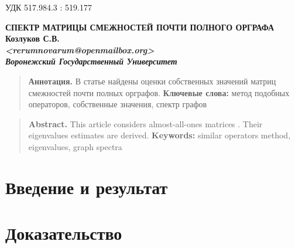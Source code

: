 \documentclass{article}
\theoremstyle{definition}
\theoremstyle{plain}
\theoremstyle{remark}
\begin{document}
\setcounter{thm}{0}
\setcounter{lemma}{0}
\quad УДК 517.984.3 : 519.177

\begin{center}
%
\vskip0.5cm
\textbf{СПЕКТР МАТРИЦЫ СМЕЖНОСТЕЙ ПОЧТИ ПОЛНОГО ОРГРАФА}\\
\vskip0.5cm
\textbf{
    \textbf{Козлуков С.В.\footnotemark} \\
    \textit{<rerumnovarum@openmailbox.org>} \\
    \textit{Воронежский Государственный Университет}
}
\end{center}


\begin{quote}
    \small{{\bf Аннотация.}
    В статье найдены оценки собственных значений
    матриц смежностей почти полных орграфов.
    }
    \textbf{Ключевые слова:}
    \small{метод подобных операторов, собственные значения, спектр графов}
\end{quote}

\begin{quote}
    \small{{\bf Abstract.}
    This article considers almost-all-ones matrices
.%
    Their eigenvalues estimates are derived.
    }
    \textbf{Keywords:}
    \small{similar operators method, eigenvalues, graph spectra}
\end{quote}

\section{Введение и результат}

\section{Доказательство}
\end{document}
